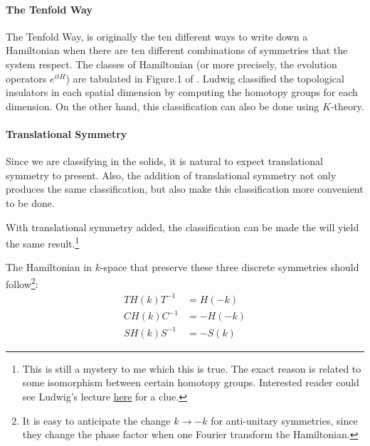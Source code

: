\paragraph{The Tenfold Way}

The Tenfold Way, is originally the ten different ways to write down a
Hamiltonian when there are ten different combinations of symmetries that the 
system respect. The classes of Hamiltonian (or more precisely, the evolution
operators $e^{itH}$) are tabulated in Figure.1 of \cite{Ludwig2016}. Ludwig
classified the topological insulators in each spatial dimension by computing the
homotopy groups for each dimension. On the other hand, this classification can
also be done using $K$-theory.

\paragraph{Translational Symmetry}

Since we are classifying in the solids, it is natural to expect translational
symmetry to present. Also, the addition of translational symmetry not only
produces the same classification, but also make this classification more
convenient to be done.

With translational symmetry added, the classification can be made the will yield
the same result.\footnote{This is still a mystery to me which this is true. The
	exact reason is related to some isomorphism between certain homotopy groups.
	Interested reader could see Ludwig's lecture
	\href{http://boulderschool.yale.edu/2016/boulder-school-2016-lecture-notes}{here}
	for a clue.}

The Hamiltonian in $k$-space that preserve these three discrete symmetries
should follow\footnote{It is easy to anticipate the change $k\to -k$ for
	anti-unitary symmetries, since they change the phase factor when one Fourier
	transform the Hamiltonian.}:
\begin{subequations}
	\begin{align}
	\label{eq:T-sym-Hk}
	TH(k)T^{-1} &= H(-k) \\
	\label{eq:C-sym-Hk}
	CH(k)C^{-1} &= -H(-k) \\
	\label{eq:S-sym-Hk}
	SH(k)S^{-1} &= -S(k)
	\end{align}
\end{subequations}

